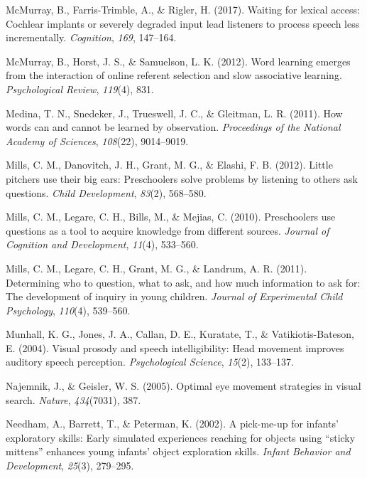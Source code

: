 \documentclass[oneside]{report}
\begin{document}
\hypertarget{ref-mcmurray2017waiting}{}
McMurray, B., Farris-Trimble, A., \& Rigler, H. (2017). Waiting for
lexical access: Cochlear implants or severely degraded input lead
listeners to process speech less incrementally. \emph{Cognition},
\emph{169}, 147--164.

\hypertarget{ref-mcmurray2012word}{}
McMurray, B., Horst, J. S., \& Samuelson, L. K. (2012). Word learning
emerges from the interaction of online referent selection and slow
associative learning. \emph{Psychological Review}, \emph{119}(4), 831.

\hypertarget{ref-medina2011words}{}
Medina, T. N., Snedeker, J., Trueswell, J. C., \& Gleitman, L. R.
(2011). How words can and cannot be learned by observation.
\emph{Proceedings of the National Academy of Sciences}, \emph{108}(22),
9014--9019.

\hypertarget{ref-mills2012little}{}
Mills, C. M., Danovitch, J. H., Grant, M. G., \& Elashi, F. B. (2012).
Little pitchers use their big ears: Preschoolers solve problems by
listening to others ask questions. \emph{Child Development},
\emph{83}(2), 568--580.

\hypertarget{ref-mills2010preschoolers}{}
Mills, C. M., Legare, C. H., Bills, M., \& Mejias, C. (2010).
Preschoolers use questions as a tool to acquire knowledge from different
sources. \emph{Journal of Cognition and Development}, \emph{11}(4),
533--560.

\hypertarget{ref-mills2011determining}{}
Mills, C. M., Legare, C. H., Grant, M. G., \& Landrum, A. R. (2011).
Determining who to question, what to ask, and how much information to
ask for: The development of inquiry in young children. \emph{Journal of
Experimental Child Psychology}, \emph{110}(4), 539--560.

\hypertarget{ref-munhall2004visual}{}
Munhall, K. G., Jones, J. A., Callan, D. E., Kuratate, T., \&
Vatikiotis-Bateson, E. (2004). Visual prosody and speech
intelligibility: Head movement improves auditory speech perception.
\emph{Psychological Science}, \emph{15}(2), 133--137.

\hypertarget{ref-najemnik2005optimal}{}
Najemnik, J., \& Geisler, W. S. (2005). Optimal eye movement strategies
in visual search. \emph{Nature}, \emph{434}(7031), 387.

\hypertarget{ref-needham2002pick}{}
Needham, A., Barrett, T., \& Peterman, K. (2002). A pick-me-up for
infants' exploratory skills: Early simulated experiences reaching for
objects using ``sticky mittens'' enhances young infants' object
exploration skills. \emph{Infant Behavior and Development},
\emph{25}(3), 279--295.
\end{document}
